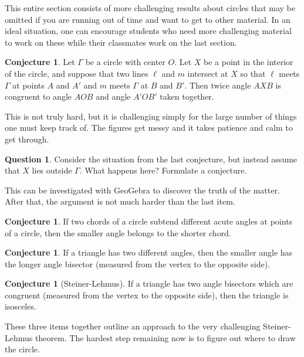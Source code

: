 \documentclass{tufte-handout}
\theoremstyle{definition}
\newtheorem{conjecture}[problem]{Conjecture}
\newtheorem{question}[problem]{Question}
\begin{document}
This entire section consists of more challenging results about circles that may be omitted if you are running out of time and want to get to other material. In an ideal situation, one can encourage students who need more challenging material to work on these while their classmates
work on the last section.

\begin{conjecture}
Let $\Gamma$ be a circle with center $O$. Let $X$ be a point in the interior of the circle, and suppose that two lines $\ell$ and $m$ intersect at $X$ so that $\ell$ meets $\Gamma$ at points $A$ and $A'$ and $m$ meets $\Gamma$ at $B$ and $B'$.
Then twice angle $AXB$ is congruent to angle $AOB$ and angle $A'OB'$ taken together.
\end{conjecture}

This is not truly hard, but it is challenging simply for the large number of things one must keep track of. The figures get messy and it takes patience and calm to get through.

\begin{question}
Consider the situation from the last conjecture, but instead assume that $X$ lies outside $\Gamma$. What happens here? Formulate a conjecture.
\end{question}

This can be investigated with GeoGebra to discover the truth of the matter. After that, the argument is not much harder than the last item.



\begin{conjecture}
If two chords of a circle subtend different acute angles at points of a circle, then the smaller angle belongs to the shorter chord.
\end{conjecture}


\begin{conjecture}
If a triangle has two different angles, then the smaller angle has the longer angle bisector (measured from the vertex to the opposite side).
\end{conjecture}

\begin{conjecture}[Steiner-Lehmus]
If a triangle has two angle bisectors which are congruent (measured from the vertex to the opposite side), then the triangle is isosceles.
\end{conjecture}

These three items together outline an approach to the very challenging Steiner-Lehmus theorem. The hardest step remaining now is to figure out where to draw the circle.
\end{document}
